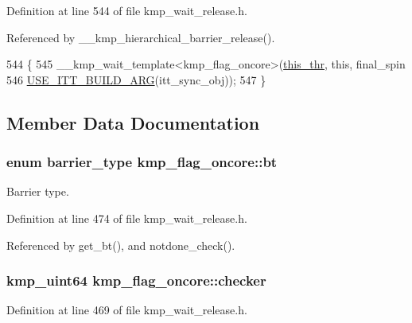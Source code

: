 Definition at line 544 of file kmp\-\_\-wait\-\_\-release.\-h.



Referenced by \-\_\-\-\_\-kmp\-\_\-hierarchical\-\_\-barrier\-\_\-release().


\begin{DoxyCode}
544                                                     \{
545         \_\_kmp\_wait\_template<kmp\_flag\_oncore>(\hyperlink{classkmp__flag__oncore_ab6a0844b7170dfffc0c9a748eaa5690e}{this\_thr}, \textcolor{keyword}{this}, final\_spin
546                             \hyperlink{kmp__itt_8h_ac31864b9b5b30f5dcac5ab285ee97ae0}{USE\_ITT\_BUILD\_ARG}(itt\_sync\_obj));
547     \}
\end{DoxyCode}


\subsection{Member Data Documentation}
\hypertarget{classkmp__flag__oncore_a01bdd210c6e9b5a3004cf42caa7e0226}{
\subsubsection[{bt}]{\setlength{\rightskip}{0pt plus 5cm}enum {\bf barrier\-\_\-type} kmp\-\_\-flag\-\_\-oncore\-::bt\hspace{0.3cm}{\ttfamily [private]}}}\label{classkmp__flag__oncore_a01bdd210c6e9b5a3004cf42caa7e0226}
Barrier type. 

Definition at line 474 of file kmp\-\_\-wait\-\_\-release.\-h.



Referenced by get\-\_\-bt(), and notdone\-\_\-check().

\hypertarget{classkmp__flag__oncore_a6e37c88438049fcea75785705b281d83}{
\subsubsection[{checker}]{\setlength{\rightskip}{0pt plus 5cm}kmp\-\_\-uint64 kmp\-\_\-flag\-\_\-oncore\-::checker\hspace{0.3cm}{\ttfamily [private]}}}\label{classkmp__flag__oncore_a6e37c88438049fcea75785705b281d83}


Definition at line 469 of file kmp\-\_\-wait\-\_\-release.\-h.



